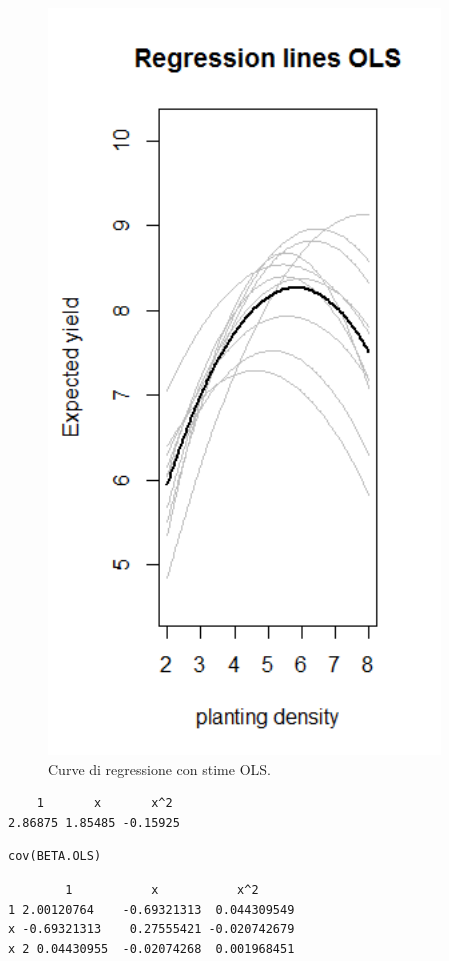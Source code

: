 \begin{figure}
    \centering
    \includegraphics[totalheight=8cm]{img/esercizio11-2-1.png}
    \caption{ Curve di regressione con stime OLS.}
\end{figure}

{
\color{red}
\begin{Verbatim}
    1       x       x^2
2.86875 1.85485 -0.15925
\end{Verbatim}
}

\begin{lstlisting}[style=R]
cov(BETA.OLS)
\end{lstlisting}

{
\color{red}
\begin{Verbatim}
        1           x           x^2
1 2.00120764    -0.69321313  0.044309549
x -0.69321313    0.27555421 -0.020742679
x 2 0.04430955  -0.02074268  0.001968451
\end{Verbatim}
}

